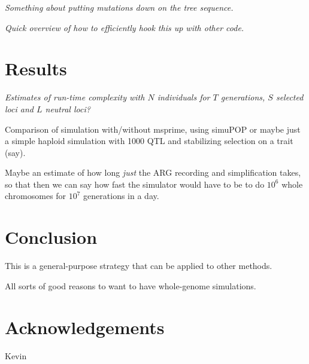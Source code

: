 \documentclass{article}
\newcommand{\plr}[1]{{\em \color{blue} #1}}
\begin{document}
\plr{Something about putting mutations down on the tree sequence.}

\plr{Quick overview of how to efficiently hook this up with other code.}

\section*{Results}

\plr{Estimates of run-time complexity with $N$ individuals for $T$ generations, $S$ selected loci and $L$ neutral loci?}

Comparison of simulation with/without msprime, using simuPOP 
or maybe just a simple haploid simulation with 1000 QTL and stabilizing selection on a trait (say).

Maybe an estimate of how long \emph{just} the ARG recording and simplification takes,
so that then we can say how fast the simulator would have to be to do $10^6$ whole chromosomes for $10^7$ generations
in a day.

\section*{Conclusion}

This is a general-purpose strategy that can be applied to other methods.

All sorts of good reasons to want to have whole-genome simulations.

\section*{Acknowledgements}

Kevin 
\end{document}
